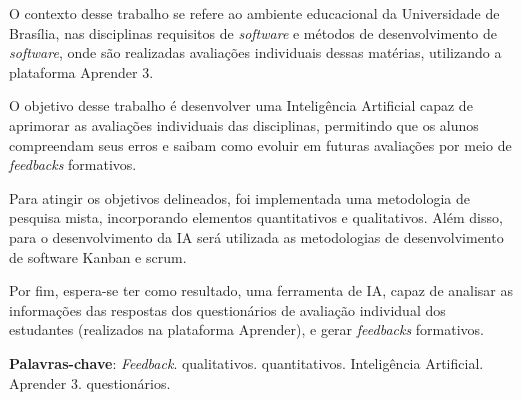 \begin{resumo}

    O contexto desse trabalho se refere ao ambiente educacional da Universidade de Brasília, nas disciplinas requisitos de \textit{software} e métodos de desenvolvimento de \textit{software}, onde são realizadas avaliações individuais dessas matérias, utilizando a plataforma Aprender 3. 

    O objetivo desse trabalho é desenvolver uma Inteligência Artificial capaz de aprimorar as avaliações individuais das disciplinas, permitindo que os alunos compreendam seus erros e saibam como evoluir em futuras avaliações por meio de \textit{feedbacks} formativos.

    Para atingir os objetivos delineados, foi implementada uma metodologia de pesquisa mista, incorporando elementos quantitativos e qualitativos. Além disso, para o desenvolvimento da IA será utilizada as metodologias de desenvolvimento de software Kanban e scrum.

    Por fim, espera-se ter como resultado, uma ferramenta de IA, capaz de analisar as informações das respostas dos questionários de avaliação individual dos estudantes (realizados na plataforma Aprender), e gerar \textit{feedbacks} formativos.

 \vspace{\onelineskip}
    
 \noindent
 \textbf{Palavras-chave}: \textit{Feedback}. qualitativos. quantitativos. Inteligência Artificial. Aprender 3. questionários. 
\end{resumo}
